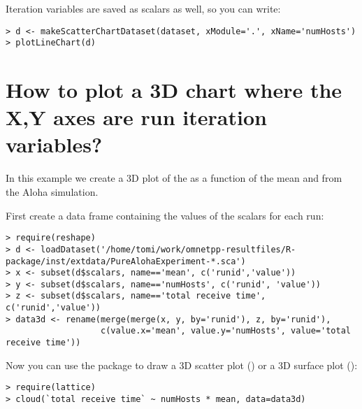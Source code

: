 Iteration variables are saved as scalars as well, so you can write:

\begin{verbatim}
> d <- makeScatterChartDataset(dataset, xModule='.', xName='numHosts')
> plotLineChart(d)
\end{verbatim}

\section{How to plot a 3D chart where the X,Y axes are run iteration variables?}

In this example we create a 3D plot of the  as a function
of the mean  and  from the Aloha simulation.

First create a data frame containing the values of the scalars for each run:
 
\begin{verbatim}
> require(reshape)
> d <- loadDataset('/home/tomi/work/omnetpp-resultfiles/R-package/inst/extdata/PureAlohaExperiment-*.sca')
> x <- subset(d$scalars, name=='mean', c('runid','value'))
> y <- subset(d$scalars, name=='numHosts', c('runid', 'value'))
> z <- subset(d$scalars, name=='total receive time', c('runid','value'))
> data3d <- rename(merge(merge(x, y, by='runid'), z, by='runid'),
                   c(value.x='mean', value.y='numHosts', value='total receive time'))
\end{verbatim}

Now you can use the  package to draw a 3D scatter plot () or a
3D surface plot ():

\begin{verbatim}
> require(lattice)
> cloud(`total receive time` ~ numHosts * mean, data=data3d)
\end{verbatim}

